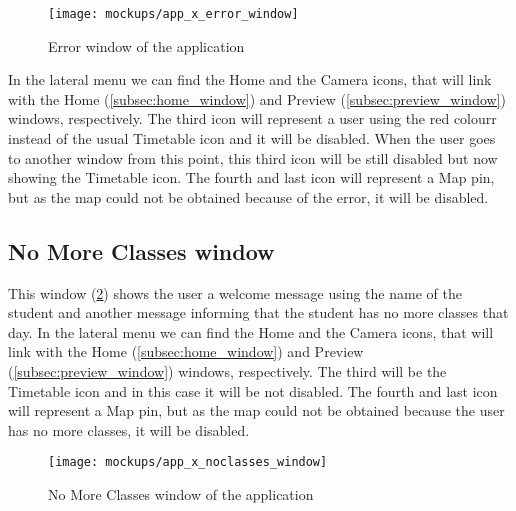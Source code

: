	\begin{figure}[!ht]
		\centering
		\texttt{[image: mockups/app\_x\_error\_window]}
		\caption{Error window of the application}
		\label{fig:error_window}
	\end{figure}	

	In the lateral menu we can find the Home and the Camera icons, that will link with the Home (\ref{subsec:home_window}) and Preview (\ref{subsec:preview_window}) windows, respectively. The third icon will represent a user using the red colourr instead of the usual Timetable icon and it will be disabled. When the user goes to another window from this point, this third icon will be still disabled but now showing the Timetable icon. The fourth and last icon will represent a Map pin, but as the map could not be obtained because of the error, it will be disabled.

	\subsection{No More Classes window}
	\label{subsec:no_classes}
	This window (\ref{fig:no_classes_window}) shows the user a welcome message using the name of the student and another message informing that the student has no more classes that day. In the lateral menu we can find the Home and the Camera icons, that will link with the Home (\ref{subsec:home_window}) and Preview (\ref{subsec:preview_window}) windows, respectively. The third will be the Timetable icon and in this case it will be not disabled.
	The fourth and last icon will represent a Map pin, but as the map could not be obtained because the user has no more classes, it will be disabled.

	\begin{figure}[!ht]
		\centering
		\texttt{[image: mockups/app\_x\_noclasses\_window]}
		\caption{No More Classes window of the application}
		\label{fig:no_classes_window}
	\end{figure}	



                                                                                              

